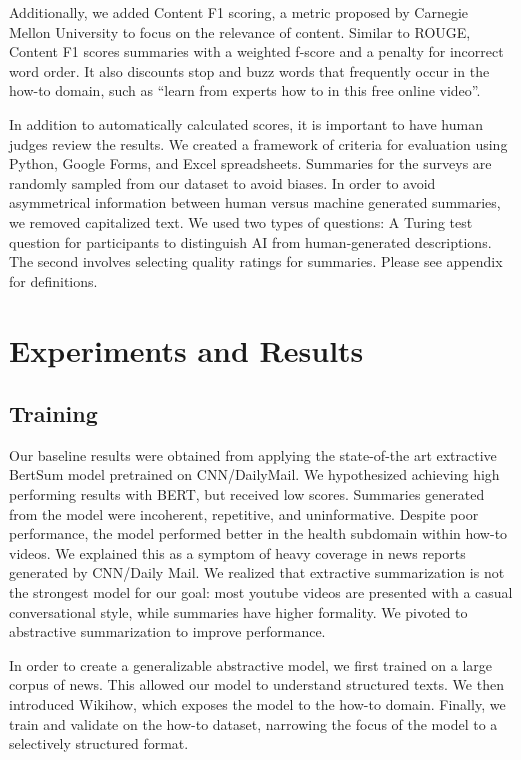 \documentclass{article}
\begin{document}
Additionally, we added Content F1 scoring, a metric proposed by Carnegie Mellon University to focus on the relevance of content. Similar to ROUGE, Content F1 scores summaries with a weighted f-score and a penalty for incorrect word order. It also discounts stop and buzz words that frequently occur in the how-to domain, such as “learn from experts how to in this free online video”.  

In addition to automatically calculated scores, it is important to have human judges review the results. We created a framework of criteria for evaluation using Python, Google Forms, and Excel spreadsheets. Summaries for the surveys are randomly sampled from our dataset to avoid biases. In order to avoid asymmetrical information between human versus machine generated summaries, we removed capitalized text. We used two types of questions: A Turing test question for participants to distinguish AI from human-generated descriptions. The second involves selecting quality ratings for summaries. Please see appendix for definitions.

\section{Experiments and Results}

\subsection{Training}
Our baseline results were obtained from applying the state-of-the art extractive BertSum model pretrained on CNN/DailyMail. We hypothesized achieving high performing results with BERT, but received low scores. Summaries generated from the model were incoherent, repetitive, and uninformative. Despite poor performance, the model performed better in the health subdomain within how-to videos. We explained this as a symptom of heavy coverage in news reports generated by CNN/Daily Mail. We realized that extractive summarization is not the strongest model for our goal: most youtube videos are presented with a casual conversational style, while summaries have higher formality. We pivoted to abstractive summarization to improve performance. 

In order to create a generalizable abstractive model, we first trained on a large corpus of news. This allowed our model to understand structured texts. We then introduced Wikihow, which exposes the model to the how-to domain. Finally, we train and validate on the how-to dataset, narrowing the focus of the model to a selectively structured format. 
\end{document}
